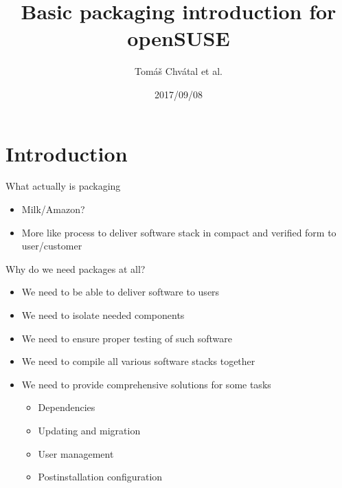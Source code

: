 \documentclass{beamer}
\author{Tom\'{a}\v{s} Chv\'{a}tal et al.\newline {\small tchvatal@suse.com}\newline {\small Packaging/L3 - Packaging}}
\title{Basic packaging introduction for openSUSE}
\date{2017/09/08}
\begin{document}
\begin{frame}[t,plain]
\titlepage
\end{frame}

\section{Introduction}

\begin{frame}[t]{What actually is packaging}
	\begin{itemize}
	\item Milk/Amazon?
	\item More like process to deliver software stack in compact and verified form to user/customer
	\end{itemize}
\end{frame}


\begin{frame}[t]{Why do we need packages at all?}
	\begin{itemize}
	\item We need to be able to deliver software to users
  \item We need to isolate needed components
	\item We need to ensure proper testing of such software
	\item We need to compile all various software stacks together
	\item We need to provide comprehensive solutions for some tasks
    \begin{itemize}
      \item Dependencies
      \item Updating and migration
      \item User management
      \item Postinstallation configuration
    \end{itemize}
	\end{itemize}
\end{frame}
\end{document}
